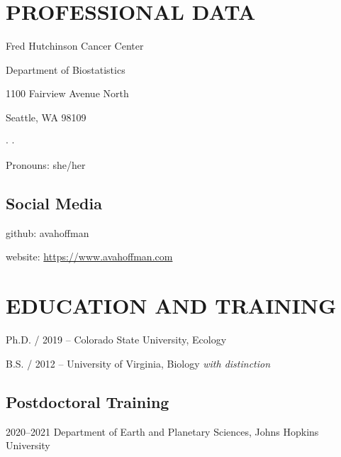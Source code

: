 \documentclass{cv}
\begin{document}


\section*{PROFESSIONAL DATA}

Fred Hutchinson Cancer Center

Department of Biostatistics

1100 Fairview Avenue North

Seattle, WA 98109

 $\cdot$  $\cdot$ 

Pronouns: she/her

\subsection*{Social Media}

github: avahoffman

website: \href{https://www.avahoffman.com}{https://www.avahoffman.com}


\section*{EDUCATION AND TRAINING}

Ph.D. / 2019 -- Colorado State University, Ecology

B.S. / 2012 -- University of Virginia, Biology \textit{with distinction}

\subsection*{Postdoctoral Training}

2020--2021 Department of Earth and Planetary Sciences,  Johns Hopkins University

\end{document}

